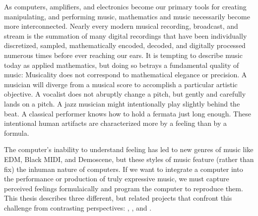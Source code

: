 As computers, amplifiers, and electronics become our primary tools for
creating manipulating, and performing music, mathematics and music
necessarily become more interconnected. Nearly every modern musical
recording, broadcast, and stream is the summation of many digital
recordings that have been individually discretized, sampled,
mathematically encoded, decoded, and digitally processed numerous
times before ever reaching our ears.\cite{Case2007} It is tempting to
describe music today as applied mathematics, but doing so betrays a
fundamental quality of music: Musicality does not correspond to %
mathematical elegance or precision. A musician will diverge from a
musical score to accomplish a particular artistic objective. A
vocalist does not abruptly change a pitch, but gently and carefully
lands on a pitch. A jazz musician might intentionally play slightly
behind the beat. A classical performer knows how to hold a fermata
just long enough. These intentional human artifacts are characterized
more by a feeling than by a formula.

The computer's inability to understand feeling has led to new genres
of music like EDM, Black
MIDI, and Demoscene, but these styles of music
feature (rather than fix) the inhuman nature of computers. If we want
to integrate a computer into the performance or production of truly
expressive music, we must capture perceived feelings formulaically
and program the computer to reproduce them. This thesis describes
three different, but related projects that confront this challenge from
contrasting perspectives: , \polytempic, and \thesis.

